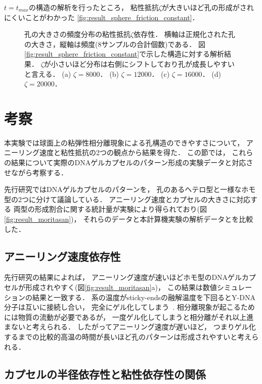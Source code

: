 $t=t_{max}$の構造の解析を行ったところ，
粘性抵抗$\zeta$が大きいほど孔の形成がされにくいことがわかった
\ref{fig:result_sphere_friction_constant}．

\begin{figure}
\centering

\caption{
    孔の大きさの頻度分布の粘性抵抗$\zeta$依存性．
    横軸は正規化された孔の大きさ，縦軸は頻度(8サンプルの合計個数)である．
    図\ref{fig:result_sphere_friction_constant}で示した構造に対する解析結果．
    $\zeta$が小さいほど分布は右側にシフトしており孔が成長しやすいと言える．
    (a) $\zeta=8000$．
    (b) $\zeta=12000$．
    (c) $\zeta=16000$．
    (d) $\zeta=20000$．
}
\label{fig:result_sphere_friction_constant_hist}
\end{figure}


\section{考察}

本実験では球面上の粘弾性相分離現象による孔構造のできやすさについて，
アニーリング速度と粘性抵抗の2つの観点から結果を得た．
この節では，
これらの結果について実際のDNAゲルカプセルのパターン形成の実験データと対応させながら考察する．

先行研究ではDNAゲルカプセルのパターンを，
孔のあるヘテロ型と一様なホモ型の2つに分けて議論している．
アニーリング速度とカプセルの大きさに対応する
両型の形成割合に関する統計量が実験により得られており(図\ref{fig:result_moritasan})，
それらのデータと本計算機実験の解析データとを比較した．

\subsection{アニーリング速度依存性}

先行研究の結果によれば，
アニーリング速度が速いほどホモ型のDNAゲルカプセルが形成されやすく(図\ref{fig:result_moritasan}a)，
この結果は数値シミュレーションの結果と一致する．
系の温度がsticky-endsの融解温度を下回るとY-DNA分子は互いに接続し合い，
完全にゲル化してしまう~\cite{sato2019sequence}.
相分離現象が起こるためには物質の流動が必要であるが，
一度ゲル化してしまうと相分離がそれ以上進まないと考えられる．
したがってアニーリング速度が遅いほど，
つまりゲル化するまでの比較的高温の時間が長いほど孔のパターンは形成されやすいと考えられる．


\subsection{カプセルの半径依存性と粘性依存性の関係}

